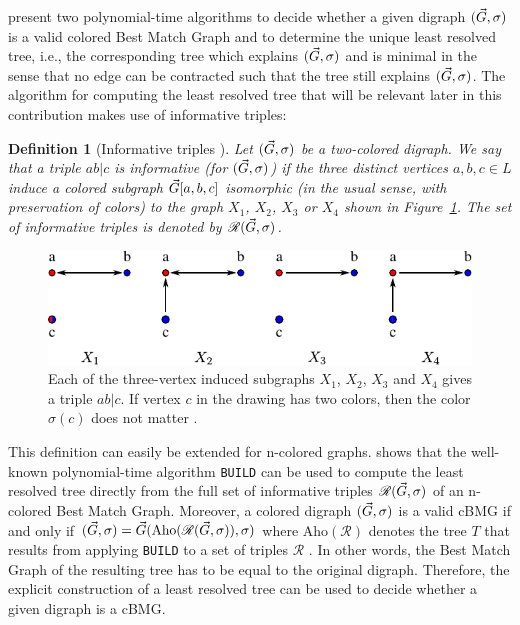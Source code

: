 \documentclass[hidelinks,11pt]{scrreprt}
\newtheorem{definition}[theorem]{Definition}
\def\arrowedvec{\mathaccent"017E}
\newcommand{\G}{\arrowedvec{G}}
\begin{document}
\citet{geiss2019a} present two polynomial-time algorithms to decide whether a given digraph $(\G,\sigma)$ is a valid colored Best Match Graph and to determine the unique least resolved tree, i.e., the corresponding tree which explains $(\G,\sigma)$ and is minimal in the sense that no edge can be contracted such that the tree still explains $(\G,\sigma)$. The algorithm for computing the least resolved tree that will be relevant later in this contribution makes use of informative triples:

\begin{definition}[Informative triples {\citep[Def.~8]{geiss2019a}}]
	\label{def:inftriples}
	Let $(\protect\G,\sigma)$ be a two-colored digraph. We say that a triple $ab|c$ is \emph{informative} (for $(\protect\G,\sigma)$) if the three distinct vertices $a,b,c\in L$ induce a colored subgraph $\protect\G[a,b,c]$ isomorphic (in the usual sense, with preservation of colors) to the graph $X_1$, $X_2$, $X_3$ or $X_4$ shown in Figure~\ref{fig:triples}. The set of informative triples is denoted by $\mathscr{R}(\protect\G,\sigma)$.
\end{definition}

\vspace{5mm}
\begin{figure}[ht]
	\begin{center}     
		\includegraphics[width=0.7\columnwidth]{Triples.pdf}
	\end{center}
	\caption[Three-vertex induced subgraphs giving an informative triple]{Each of the three-vertex induced subgraphs $X_1$, $X_2$, $X_3$ and $X_4$ gives a triple $ab|c$. If vertex $c$ in the drawing has two colors, then the color $\sigma(c)$ does not matter \citep{geiss2019a}.}
	\label{fig:triples}
\end{figure}

This definition can easily be extended for n-colored graphs. \citet{geiss2019a} shows that the well-known polynomial-time algorithm \texttt{BUILD} \citep{aho1981} can be used to compute the least resolved tree directly from the full set of informative triples $\mathscr{R}(\protect\G,\sigma)$ of an n-colored Best Match Graph. Moreover, a colored digraph $(\G,\sigma)$ is a valid cBMG if and only if $(\G,\sigma) = \G(\textrm{Aho}(\mathscr{R}(\G,\sigma)),\sigma)$ where $\textrm{Aho}(\mathscr{R})$ denotes the tree $T$ that results from applying \texttt{BUILD} to a set of triples $\mathscr{R}$ \citep[][cf.~Theorems 6 and 9]{geiss2019a}. In other words, the Best Match Graph of the resulting tree has to be equal to the original digraph. Therefore, the explicit construction of a least resolved tree can be used to decide whether a given digraph is a cBMG.
\end{document}
